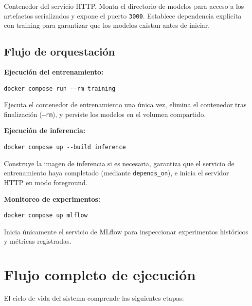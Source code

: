 \documentclass{ULBreport} %
\begin{document}
Contenedor del servicio HTTP. Monta el directorio de modelos para acceso a los artefactos serializados y expone el puerto \texttt{3000}. Establece dependencia explícita con training para garantizar que los modelos existan antes de iniciar.

\subsection{Flujo de orquestación}

\textbf{Ejecución del entrenamiento:}

\begin{verbatim}
docker compose run --rm training
\end{verbatim}

Ejecuta el contenedor de entrenamiento una única vez, elimina el contenedor tras finalización (\texttt{--rm}), y persiste los modelos en el volumen compartido.

\textbf{Ejecución de inferencia:}

\begin{verbatim}
docker compose up --build inference
\end{verbatim}

Construye la imagen de inferencia si es necesaria, garantiza que el servicio de entrenamiento haya completado (mediante \texttt{depends\_on}), e inicia el servidor HTTP en modo foreground.

\textbf{Monitoreo de experimentos:}

\begin{verbatim}
docker compose up mlflow
\end{verbatim}

Inicia únicamente el servicio de MLflow para inspeccionar experimentos históricos y métricas registradas.

\section{Flujo completo de ejecución}

El ciclo de vida del sistema comprende las siguientes etapas:
\end{document}
